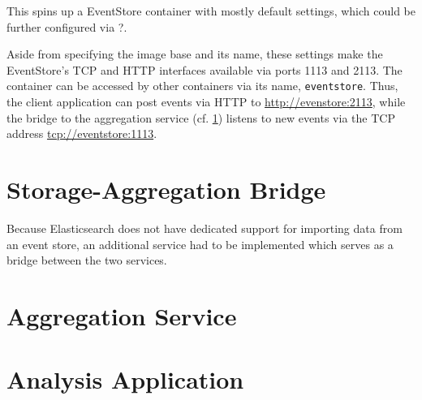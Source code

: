 
This spins up a EventStore container with mostly default settings, which could be further configured via ?.

Aside from specifying the image base and its name, these settings make the EventStore's TCP and HTTP interfaces available via ports 1113 and 2113.
The container can be accessed by other containers via its name, \texttt{eventstore}.
Thus, the client application can post events via HTTP to \url{http://evenstore:2113}, while the bridge to the aggregation service (cf. \cref{sec:implementation:bridge}) listens to new events via the TCP address \url{tcp://eventstore:1113}.

\section{Storage-Aggregation Bridge}
\label{sec:implementation:bridge}

Because Elasticsearch does not have dedicated support for importing data from an event store, an additional service had to be implemented which serves as a bridge between the two services.

\section{Aggregation Service}
\label{sec:implementation:aggregation}

\section{Analysis Application}
\label{sec:implementation:analysis}


